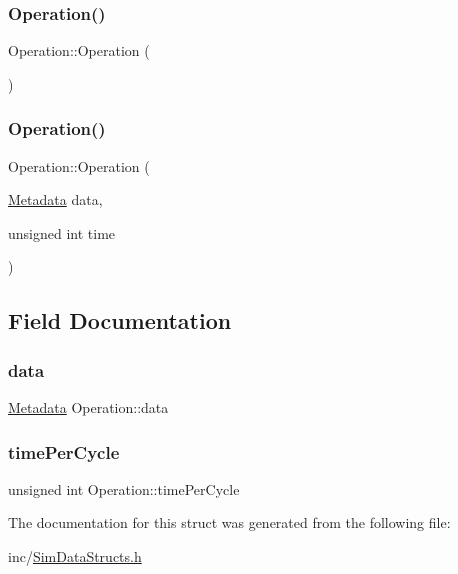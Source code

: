 \subsubsection{\texorpdfstring{Operation()}{Operation()}\hspace{0.1cm}{\footnotesize\ttfamily [1/2]}}
{\footnotesize\ttfamily Operation\+::\+Operation (\begin{DoxyParamCaption}{ }\end{DoxyParamCaption})\hspace{0.3cm}{\ttfamily [inline]}}

\hypertarget{struct_operation_a9fb1b5e49564f3b8e5f9b05a133bd3e8}{}\label{struct_operation_a9fb1b5e49564f3b8e5f9b05a133bd3e8} 
\subsubsection{\texorpdfstring{Operation()}{Operation()}\hspace{0.1cm}{\footnotesize\ttfamily [2/2]}}
{\footnotesize\ttfamily Operation\+::\+Operation (\begin{DoxyParamCaption}\item[{\hyperlink{struct_metadata}{Metadata}}]{data,  }\item[{unsigned int}]{time }\end{DoxyParamCaption})\hspace{0.3cm}{\ttfamily [inline]}}



\subsection{Field Documentation}
\hypertarget{struct_operation_a133be6e6b21e5606f20fcf22a884d1c7}{}\label{struct_operation_a133be6e6b21e5606f20fcf22a884d1c7} 
\subsubsection{\texorpdfstring{data}{data}}
{\footnotesize\ttfamily \hyperlink{struct_metadata}{Metadata} Operation\+::data}

\hypertarget{struct_operation_a0cdc628f45dec91256582c43dfe18e1d}{}\label{struct_operation_a0cdc628f45dec91256582c43dfe18e1d} 
\subsubsection{\texorpdfstring{time\+Per\+Cycle}{timePerCycle}}
{\footnotesize\ttfamily unsigned int Operation\+::time\+Per\+Cycle}



The documentation for this struct was generated from the following file\+:\begin{DoxyCompactItemize}
\item 
inc/\hyperlink{_sim_data_structs_8h}{Sim\+Data\+Structs.\+h}\end{DoxyCompactItemize}
